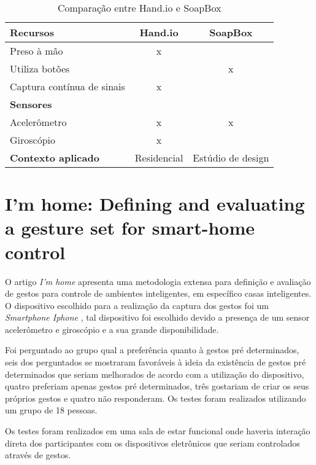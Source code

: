 \begin{table}[ht]
	\centering
    \caption{Comparação entre Hand.io e SoapBox}
    \label{tab:comp_soapbox}
	\begin{tabular}{|l|c|c|}
    	\hline
		\textbf{Recursos} & \textbf{Hand.io} & \textbf{SoapBox} \\
        \hline
        \hline
        Preso à mão & x &  \\
        \hline
        Utiliza botões &  & x \\
        \hline
        Captura contínua de sinais & x &  \\
        \hline
        \hline
        \textbf{Sensores} & & \\
        \hline
        \hline
        Acelerômetro & x & x \\
        \hline
        Giroscópio & x & \\
        \hline
        \hline
        \textbf{Contexto aplicado} & Residencial & Estúdio de design \\
        \hline
	\end{tabular}

\end{table}




\section{I'm home: Defining and evaluating a gesture set for smart-home control}

O artigo \textit{I'm home} \cite{imhome:2011} apresenta uma metodologia extensa para definição e avaliação de gestos para controle de ambientes inteligentes, em específico casas inteligentes. 
O dispositivo escolhido para a realização da captura dos gestos foi um \textit{Smartphone Iphone} , tal dispositivo foi escolhido devido a presença de um sensor acelerômetro e giroscópio e a sua grande disponibilidade. 

Foi perguntado ao grupo qual a preferência quanto à gestos pré determinados, seis dos perguntados se mostraram favoráveis à ideia da existência de gestos pré determinados que seriam melhorados de acordo com a utilização do dispositivo, quatro preferiam apenas gestos pré determinados, três gostariam de criar os seus próprios gestos e quatro não responderam. Os testes foram realizados utilizando um grupo de 18 pessoas. 

Os testes foram realizados em uma sala de estar funcional onde haveria interação direta dos participantes com os dispositivos eletrônicos que seriam controlados através de gestos.


